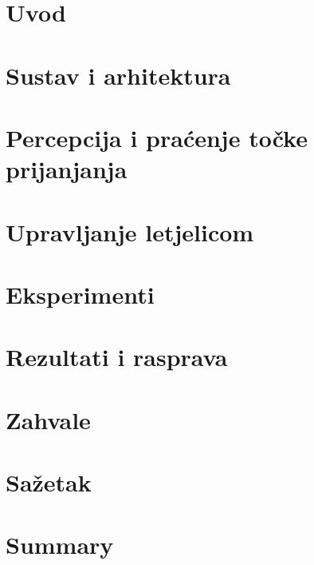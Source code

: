 \documentclass[12pt,a4paper]{report}
\begin{document}
\chapter{Uvod}
\label{ch:uvod}


\chapter{Sustav i arhitektura}
\label{ch:sustav}


\chapter{Percepcija i praćenje točke prijanjanja}
\label{ch:percepcija}


\chapter{Upravljanje letjelicom}
\label{ch:upravljanje}


\chapter{Eksperimenti}
\label{ch:eksperimenti}


\chapter{Rezultati i rasprava}
\label{ch:rezultati}


\chapter*{Zahvale}


\printbibliography[heading=bibintoc,title={Popis literature}]

\chapter*{Sažetak}


\chapter*{Summary}

\end{document}
